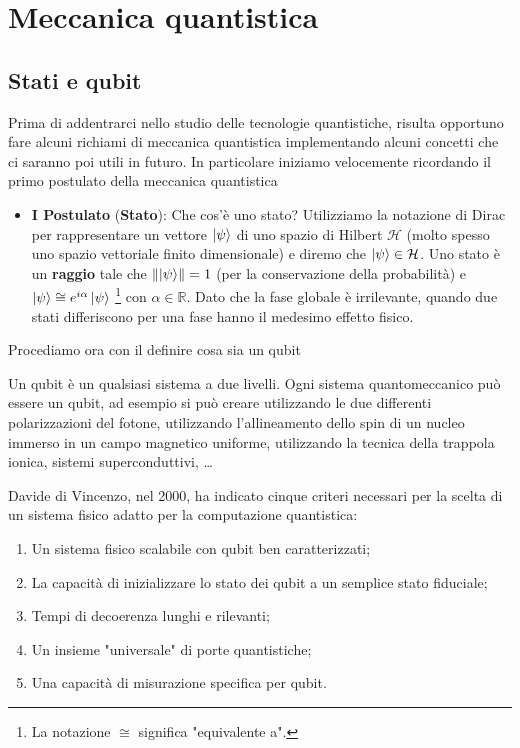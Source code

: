 
\chapter{Meccanica quantistica}

\section{Stati e qubit}
Prima di addentrarci nello studio delle tecnologie quantistiche, risulta opportuno fare alcuni richiami di meccanica quantistica implementando alcuni concetti che ci saranno poi utili in futuro. In particolare iniziamo velocemente ricordando il primo postulato della meccanica quantistica
\begin{itemize}
    \item \textbf{I Postulato} (\textbf{Stato}): Che cos'è uno stato? Utilizziamo la notazione di Dirac per rappresentare un vettore $\ket{\psi}$ di uno spazio di Hilbert $\mathcal{H}$ (molto spesso uno spazio vettoriale finito dimensionale) e diremo che $\ket{\psi} \in \mathcal{H}$. Uno stato è un \textbf{raggio} tale che $\norm{\ket{\psi}} = 1$ (per la conservazione della probabilità) e $\ket{\psi} \cong e^{i \alpha} \ket{\psi}$ \footnote{La notazione $\cong$ significa "equivalente a".} con $\alpha \in \mathbb{R}$. Dato che la fase globale è irrilevante, quando due stati differiscono per una fase hanno il medesimo effetto fisico. 
\end{itemize}
Procediamo ora con il definire cosa sia un qubit
\begin{definizione}
    Un qubit è un qualsiasi sistema a due livelli. Ogni sistema quantomeccanico può essere un qubit, ad esempio si può creare utilizzando le due differenti polarizzazioni del fotone, utilizzando l’allineamento dello spin di un nucleo immerso in un campo magnetico uniforme, utilizzando la tecnica della trappola ionica, sistemi superconduttivi, \dots
\end{definizione}
\noindent Davide di Vincenzo, nel 2000, ha indicato cinque criteri necessari per la scelta di un sistema fisico adatto per la computazione quantistica:
\begin{enumerate}
    \item Un sistema fisico scalabile con qubit ben caratterizzati;
    \item La capacità di inizializzare lo stato dei qubit a un semplice stato fiduciale;
    \item Tempi di decoerenza lunghi e rilevanti;
    \item Un insieme "universale" di porte quantistiche;
    \item Una capacità di misurazione specifica per qubit.
\end{enumerate}
